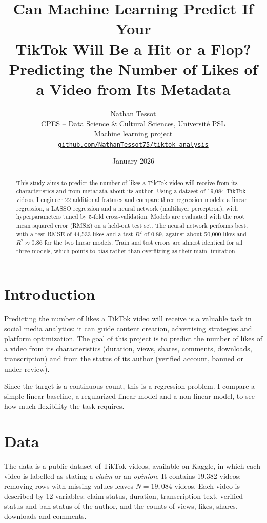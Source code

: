 \documentclass[11pt,a4paper]{article}
\title{\vspace{-1.2cm}\textbf{Can Machine Learning Predict If Your\\ TikTok Will Be a Hit or a Flop?}\\[4pt]
\large Predicting the Number of Likes of a Video from Its Metadata}
\author{Nathan Tessot\\[2pt]
\small CPES -- Data Science \& Cultural Sciences, Université PSL\\
\small Machine learning project\\[2pt]
\small \href{https://github.com/NathanTessot75/tiktok-analysis}{\texttt{github.com/NathanTessot75/tiktok-analysis}}}
\date{\small January 2026}
\begin{document}
\maketitle

\begin{abstract}
\noindent
This study aims to predict the number of likes a TikTok video will receive from
its characteristics and from metadata about its author. Using a dataset of
19,084 TikTok videos, I engineer 22 additional features and compare three
regression models: a linear regression, a LASSO regression and a neural network
(multilayer perceptron), with hyperparameters tuned by 5-fold cross-validation.
Models are evaluated with the root mean squared error (RMSE) on a held-out test
set. The neural network performs best, with a test RMSE of 44,533 likes and a
test $R^2$ of 0.89, against about 50,000 likes and $R^2 \approx 0.86$ for the
two linear models. Train and test errors are almost identical for all three
models, which points to bias rather than overfitting as their main limitation.
\end{abstract}

\section{Introduction}

Predicting the number of likes a TikTok video will receive is a valuable task
in social media analytics: it can guide content creation, advertising
strategies and platform optimization. The goal of this project is to predict the
number of likes of a video from its characteristics (duration, views, shares,
comments, downloads, transcription) and from the status of its author (verified
account, banned or under review).

Since the target is a continuous count, this is a regression problem. I compare
a simple linear baseline, a regularized linear model and a non-linear model, to
see how much flexibility the task requires.

\section{Data}

The data is a public dataset of TikTok videos, available on Kaggle, in which
each video is labelled as stating a \emph{claim} or an \emph{opinion}. It
contains 19,382 videos; removing rows with missing values leaves
$N = 19{,}084$ videos. Each video is described by 12 variables: claim status,
duration, transcription text, verified status and ban status of the author, and
the counts of views, likes, shares, downloads and comments.
\end{document}
